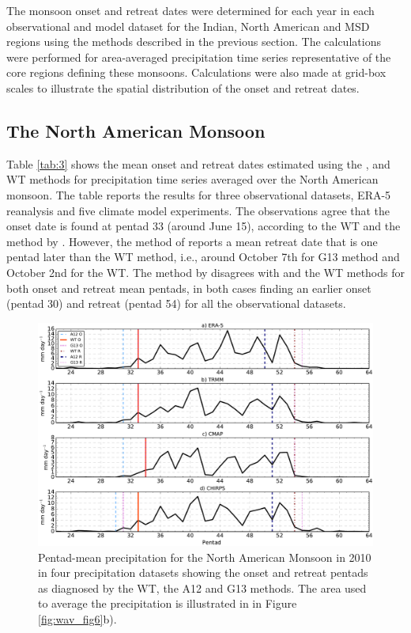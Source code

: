The monsoon onset and retreat dates were determined for each year in each observational and model dataset for the Indian, North American and MSD regions using the methods described in the previous section. The calculations were performed for area-averaged precipitation time series representative of the core regions defining these monsoons. Calculations were also made at grid-box scales to illustrate the spatial distribution of the onset and retreat dates. 


\subsection{The North American Monsoon}






Table \ref{tab:3} shows the mean onset and retreat dates estimated using the ,  and WT methods for precipitation time series averaged over the North American monsoon.
The table reports the results for three observational datasets, ERA-5 reanalysis and five climate model experiments.
The observations  agree that the onset date is found at pentad 33 (around June 15), according to the WT and the method by .
However, the method of  reports a mean retreat date that is one pentad later than the WT method, i.e., around October 7th for G13 method and October 2nd for the WT.
The method by  disagrees with  and the WT methods for both onset and retreat mean pentads, in both cases finding an earlier onset (pentad 30) and retreat (pentad 54) for all the observational datasets. 

\begin{figure}[t!]
\centering
 \includegraphics[width=\linewidth]{figures/wav_fig5.pdf}
\caption[Comparison of methods in 2010 in the North American Monsoon]{  Pentad-mean precipitation for the North American Monsoon in 2010 in four precipitation datasets showing the onset and retreat pentads as diagnosed by the WT, the A12 and G13 methods. The area used to average the precipitation is illustrated in in Figure \ref{fig:wav_fig6}b).} 
\label{fig:wav_compari}
\end{figure}


